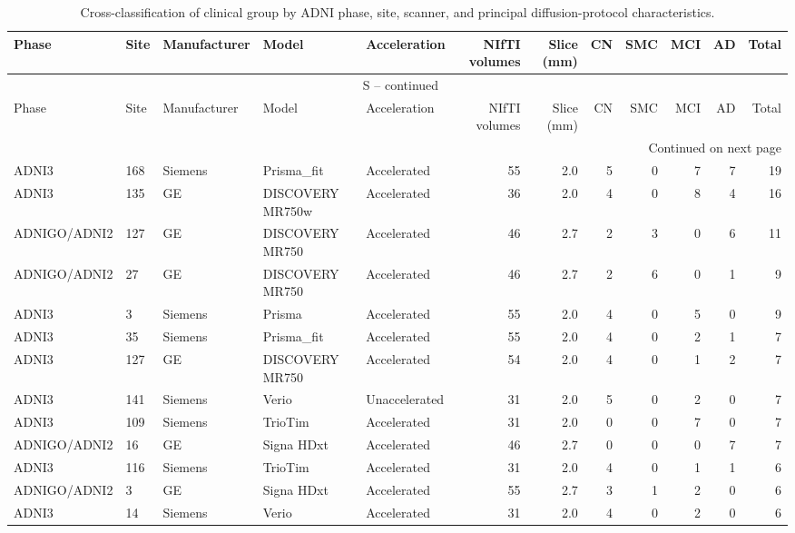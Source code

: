 \documentclass{article}
\renewcommand{\thetable}{S\arabic{table}}
\begin{document}
\begin{landscape}
\scriptsize
\setlength{\tabcolsep}{2.5pt}
\begin{longtable}{lllllrrrrrrr}
\caption{Cross-classification of clinical group by ADNI phase, site, scanner, and principal diffusion-protocol characteristics.}\label{tab:acquisition_cells} \\
\toprule
Phase & Site & Manufacturer & Model & Acceleration & NIfTI volumes & Slice (mm) & CN & SMC & MCI & AD & Total \\
\midrule
\endfirsthead
\multicolumn{12}{c}{\tablename\ \thetable{} -- continued} \\
\toprule
Phase & Site & Manufacturer & Model & Acceleration & NIfTI volumes & Slice (mm) & CN & SMC & MCI & AD & Total \\
\midrule
\endhead
\midrule
\multicolumn{12}{r}{Continued on next page} \\
\endfoot
\bottomrule
\endlastfoot
ADNI3 & 168 & Siemens & Prisma\_fit & Accelerated & 55 & 2.0 & 5 & 0 & 7 & 7 & 19 \\
ADNI3 & 135 & GE & DISCOVERY MR750w & Accelerated & 36 & 2.0 & 4 & 0 & 8 & 4 & 16 \\
ADNIGO/ADNI2 & 127 & GE & DISCOVERY MR750 & Accelerated & 46 & 2.7 & 2 & 3 & 0 & 6 & 11 \\
ADNIGO/ADNI2 & 27 & GE & DISCOVERY MR750 & Accelerated & 46 & 2.7 & 2 & 6 & 0 & 1 & 9 \\
ADNI3 & 3 & Siemens & Prisma & Accelerated & 55 & 2.0 & 4 & 0 & 5 & 0 & 9 \\
ADNI3 & 35 & Siemens & Prisma\_fit & Accelerated & 55 & 2.0 & 4 & 0 & 2 & 1 & 7 \\
ADNI3 & 127 & GE & DISCOVERY MR750 & Accelerated & 54 & 2.0 & 4 & 0 & 1 & 2 & 7 \\
ADNI3 & 141 & Siemens & Verio & Unaccelerated & 31 & 2.0 & 5 & 0 & 2 & 0 & 7 \\
ADNI3 & 109 & Siemens & TrioTim & Accelerated & 31 & 2.0 & 0 & 0 & 7 & 0 & 7 \\
ADNIGO/ADNI2 & 16 & GE & Signa HDxt & Accelerated & 46 & 2.7 & 0 & 0 & 0 & 7 & 7 \\
ADNI3 & 116 & Siemens & TrioTim & Accelerated & 31 & 2.0 & 4 & 0 & 1 & 1 & 6 \\
ADNIGO/ADNI2 & 3 & GE & Signa HDxt & Accelerated & 55 & 2.7 & 3 & 1 & 2 & 0 & 6 \\
ADNI3 & 14 & Siemens & Verio & Accelerated & 31 & 2.0 & 4 & 0 & 2 & 0 & 6 \\

\end{longtable}
\end{landscape}
\end{document}
